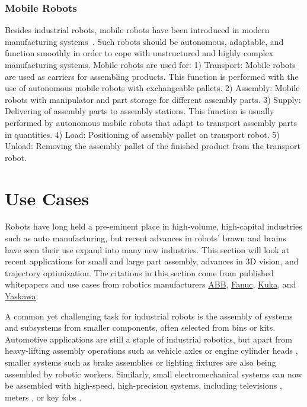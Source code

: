 \subsubsection{Mobile Robots}
Besides industrial robots, mobile robots have been introduced in modern manufacturing systems~\cite{Lazinica.Mobile.2005a,Lazinica.Mobile.2005b,Angerer.Mobile.2012,Delrobaei.Mobile.2009}. Such robots should be autonomous, adaptable, and function smoothly in order to cope with unstructured and highly complex manufacturing systems. Mobile robots are used for: 1) Transport: Mobile robots are used as carriers for assembling products. This function is performed with the use of autonomous mobile robots with exchangeable pallets. 2) Assembly: Mobile robots with manipulator and part storage for different assembly parts. 3) Supply: Delivering of assembly parts to assembly stations. This function is usually performed by autonomous mobile robots that adapt to  transport assembly parts in quantities. 4) Load: Positioning of assembly pallet on transport robot. 5) Unload: Removing the assembly pallet of the finished product from the transport robot.

\section{Use Cases}
\label{sec:uses}
Robots have long held a pre-eminent place in high-volume, high-capital industries such as auto manufacturing, but recent advances in robots' brawn and brains have seen their use expand into many new industries. This section will look at recent applications for small and large part assembly, advances in 3D vision, and trajectory optimization. The citations in this section come from published whitepapers and use cases from robotics manufacturers \href{http://new.abb.com/products/robotics}{ABB}, \href{http://www.fanucamerica.com/default.aspx}{Fanuc}, \href{http://www.kuka-robotics.com/usa/en/}{Kuka}, and \href{http://www.motoman.com/index.php}{Yaskawa}.

A common yet challenging task for industrial robots is the assembly of systems and subsystems from smaller components, often selected from bins or kits. Automotive applications are still a staple of industrial robotics, but apart from heavy-lifting assembly operations such as vehicle axles \cite{ABB4} or engine cylinder heads \cite{ABB3}, smaller systems such as brake assemblies \cite{Yaskawa1} or lighting fixtures \cite{Yaskawa2} are also being assembled by robotic workers. Similarly, small electromechanical systems can now be assembled with high-speed, high-precision systems, including televisions \cite{ABB1}, meters \cite{Fanuc1}, or key fobs \cite{Fanuc4}.

